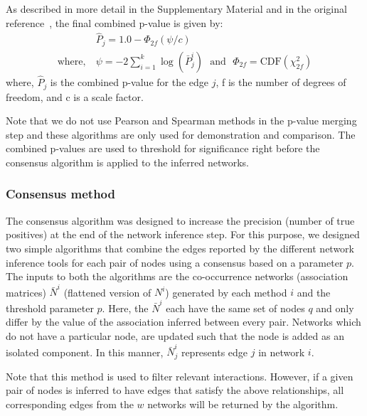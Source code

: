   As described in more detail in the Supplementary Material and in the original reference~\cite{Poole_Gibbs_Shmulevich_Bernard_Knijnenburg_2016}, the final combined p-value is given by:
  \begin{equation}
    \begin{aligned}
        & \hat{P}_j = 1.0 - \Phi_{2f}\left( \psi / c \right) \\
        \text{where},~ &\psi = -2 \sum_{i=1}^k \log(\bar{P}^i_j) ~~~\text{and}~~~ \Phi_{2f} = \mathrm{CDF}\left( \chi^2_{2f} \right)
    \end{aligned}
    \label{eqn:pvalue-combined}
  \end{equation}
  where, $\hat{P}_j$ is the combined p-value for the edge $j$, f is the number of degrees of freedom, and c is a scale factor.

  Note that we do not use Pearson and Spearman methods in the p-value merging step and these algorithms are only used for demonstration and comparison.
  The combined p-values are used to threshold for significance right before the consensus algorithm is applied to the inferred networks.

  \subsubsection*{Consensus method}
  \vspace{-5mm}

  The consensus algorithm was designed to increase the precision (number of true positives) at the end of the network inference step.
  For this purpose, we designed two simple algorithms that combine the edges reported by the different network inference tools for each pair of nodes using a consensus based on a parameter $p$.
  The inputs to both the algorithms are the co-occurrence networks (association matrices) $\bar{N}^i$ (flattened version of $N^{i}$) generated by each method $i$ and the threshold parameter $p$.
  Here, the $\bar{N}^{i}$ each have the same set of nodes $q$ and only differ by the value of the association inferred between every pair.
  Networks which do not have a particular node, are updated such that the node is added as an isolated component.
  In this manner, $\bar{N}^{i}_j$ represents edge $j$ in network $i$.

    Note that this method is used to filter relevant interactions. However, if a given pair of nodes is inferred to have edges that satisfy the above relationships, all corresponding edges from the $w$ networks will be returned by the algorithm.

